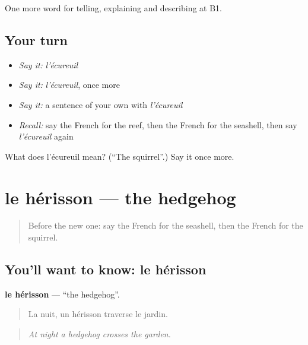 \begin{grammarlens}[title={What you've built}]
One more word for telling, explaining and describing at B1.
\end{grammarlens}

\subsection*{Your turn}
\begin{itemize}
\raggedright
  \item \emph{Say it:} \emph{l'écureuil}
  \item \emph{Say it:} \emph{l'écureuil}, once more
  \item \emph{Say it:} a sentence of your own with \emph{l'écureuil}
  \item \emph{Recall:} say the French for the reef, then the French for the seashell, then say \emph{l'écureuil} again
\end{itemize}

\begin{tcolorbox}[breakable,colback=teal!4,colframe=teal!35!black,title={Before you move on}]
What does l'écureuil mean? (\textquotedblleft{}The squirrel\textquotedblright{}.) Say it once more.
\end{tcolorbox}
\section[le hérisson]{le hérisson — the hedgehog}

\label{lesson:FR-C459-herisson}



\begin{quote}
Before the new one: say the French for the seashell, then the French for the squirrel.
\end{quote}

\subsection*{You'll want to know: le hérisson}
\textbf{le hérisson} — \textquotedblleft{}the hedgehog\textquotedblright{}.

\begin{quote}
La nuit, un hérisson traverse le jardin.
\end{quote}

\begin{quote}
\emph{At night a hedgehog crosses the garden.}
\end{quote}


